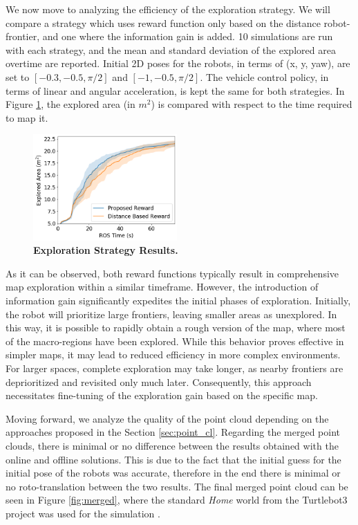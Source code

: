 We now move to analyzing the efficiency of the exploration strategy. We will compare a strategy which uses reward function only based on the distance robot-frontier, and one where the information gain is added.
10 simulations are run with each strategy, and the mean and standard deviation of the explored area overtime are reported. Initial 2D poses for the robots, in terms of (x, y, yaw), are set to $[-0.3, -0.5, \pi/2]$ and $[-1, -0.5, \pi/2]$. The vehicle control policy, in terms of linear and angular acceleration, is kept the same for both strategies.
In Figure \ref{fig:results}, the explored area (in $m^2$) is compared with respect to the time required to map it.
\begin{figure}[b]
  \begin{center}
    \includegraphics[width=0.49\textwidth]{img/mapping_speed.png}
  \end{center}
  \caption[]{
    \textbf{Exploration Strategy Results.} 
  }
  \label{fig:results}
\end{figure}
As it can be observed, both reward functions typically result in comprehensive map exploration within a similar timeframe. However, the introduction of information gain significantly expedites the initial phases of exploration. Initially, the robot will prioritize large frontiers, leaving smaller areas as unexplored. In this way, it is possible to rapidly obtain a rough version of the map, where most of the macro-regions have been explored. While this behavior proves effective in simpler maps, it may lead to reduced efficiency in more complex environments. For larger spaces, complete exploration may take longer, as nearby frontiers are deprioritized and revisited only much later. Consequently, this approach necessitates fine-tuning of the exploration gain based on the specific map.

Moving forward, we analyze the quality of the point cloud depending on the approaches proposed in the Section \ref{sec:point_cl}.
Regarding the merged point clouds, there is minimal or no difference between the results obtained with the online and offline solutions. This is due to the fact that the initial guess for the initial pose of the robots was accurate, therefore in the end there is minimal or no roto-translation between the two results. The final merged point cloud can be seen in Figure \ref{fig:merged}, where the standard \textit{Home} world from the Turtlebot3 project was used for the simulation \cite{turtlebot3-simulation}. 

